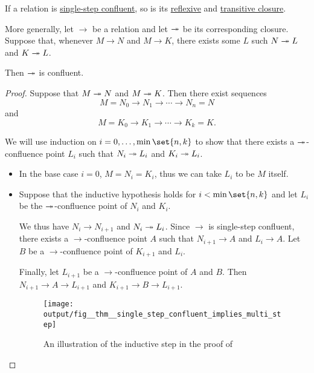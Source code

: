 \begin{proposition}\label{thm:confluence_of_reflexive_transitive_closure}
  If a relation is \hyperref[def:relation_confluence]{single-step confluent}, so is its \hyperref[def:relation_closures/transitive]{reflexive} and \hyperref[def:relation_closures/transitive]{transitive closure}.

  More generally, let \( {\to} \) be a relation and let \( {\redrel*{}} \) be its corresponding closure. Suppose that, whenever \( M \to N \) and \( M \to K \), there exists some \( L \) such \( N \redrel*{} L \) and \( K \redrel*{} L \).

  Then \( {\redrel*{}} \) is confluent.
\end{proposition}
\begin{proof}
  Suppose that \( M \redrel*{} N \) and \( M \redrel*{} K \). Then there exist sequences
  \begin{equation*}
    M = N_0 \to N_1 \to \cdots \to N_n = N
  \end{equation*}
  and
  \begin{equation*}
    M = K_0 \to K_1 \to \cdots \to K_k = K.
  \end{equation*}

  We will use induction on \( i = 0, \ldots, \min\set{ n, k } \) to show that there exists a \( {\redrel*{}} \)-confluence point \( L_i \) such that \( N_i \redrel*{} L_i \) and \( K_i \redrel*{} L_i \).

  \begin{itemize}
    \item In the base case \( i = 0 \), \( M = N_i = K_i \), thus we can take \( L_i \) to be \( M \) itself.
    \item Suppose that the inductive hypothesis holds for \( i < \min\set{ n, k } \) and let \( L_i \) be the \( {\redrel*{}} \)-confluence point of \( N_i \) and \( K_i \).

    We thus have \( N_i \to N_{i+1} \) and \( N_i \redrel*{} L_i \). Since \( \to \) is single-step confluent, there exists a \( {\to} \)-confluence point \( A \) such that \( N_{i+1} \to A \) and \( L_i \to A \). Let \( B \) be a \( {\to} \)-confluence point of \( K_{i+1} \) and \( L_i \).

    Finally, let \( L_{i+1} \) be a \( {\to} \)-confluence point of \( A \) and \( B \). Then \( N_{i+1} \to A \to L_{i+1} \) and \( K_{i+1} \to B \to L_{i+1} \).

    \begin{figure}[!ht]
      \centering
      \texttt{[image: output/fig\_\_thm\_\_single\_step\_confluent\_implies\_multi\_step]}
      \caption{An illustration of the inductive step in the proof of }\label{fig:thm:confluence_of_reflexive_transitive_closure}
    \end{figure}
  \end{itemize}


\end{proof}

